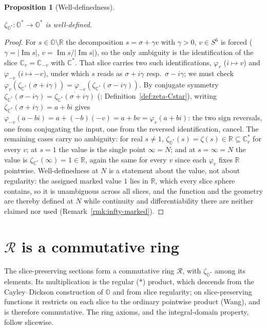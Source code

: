 \documentclass[11pt]{article}
\newcommand{\OO}{\mathbb{O}}
\newcommand{\CC}{\mathbb{C}}
\newcommand{\RR}{\mathbb{R}}
\newcommand{\Ostar}{\OO^{*}}
\newcommand{\Cstar}{\CC^{*}}
\newcommand{\zetaO}{\zeta_{\Ostar}}
\newcommand{\zetaC}{\zeta_{\Cstar}}
\DeclareMathOperator{\im}{Im}
\providecommand{\lean}[1]{}
\providecommand{\uses}[1]{}
\theoremstyle{plain}
\newtheorem{proposition}[theorem]{Proposition}
\theoremstyle{definition}
\theoremstyle{remark}
\begin{document}
\begin{proposition}[Well-definedness]\label{prop:well-defined}
\lean{zetaO_sliceEmbed', riemannZeta_conj}
\uses{def:zeta_O, thm:riemann}
$\zetaO:\Ostar\to\Ostar$ is well-defined.
\end{proposition}
\begin{proof}
For $s\in\OO\setminus\RR$ the decomposition $s=\sigma+\gamma v$ with $\gamma>0$,
$v\in S^6$ is forced ($\gamma=|\im s|$, $v=\im s/|\im s|$), so the only ambiguity is the
identification of the slice $\CC_v=\CC_{-v}$ with $\Cstar$. That slice carries two such
identifications, $\varphi_v$ ($i\mapsto v$) and $\varphi_{-v}$ ($i\mapsto-v$), under
which $s$ reads as $\sigma+i\gamma$ resp.\ $\sigma-i\gamma$; we must check
$\varphi_v(\zetaC(\sigma+i\gamma))=\varphi_{-v}(\zetaC(\sigma-i\gamma))$. By conjugate
symmetry $\zetaC(\sigma-i\gamma)=\overline{\zetaC(\sigma+i\gamma)}$
(\cite[Ch.~2]{Titchmarsh86}; Definition~\ref{def:zeta-Cstar}), writing
$\zetaC(\sigma+i\gamma)=a+bi$ gives $\varphi_{-v}(a-bi)=a+(-b)(-v)=a+bv=\varphi_v(a+bi)$:
the two sign reversals, one from conjugating the input, one from the reversed
identification, cancel. The remaining cases carry no ambiguity: for real $s\neq1$,
$\zetaO(s)=\zeta(s)\in\RR\subseteq\CC_v^{*}$ for every $v$; at $s=1$ the value is the
single point $\infty=N$; and at $s=\infty=N$ the value is $\zetaC(\infty)=1\in\RR$, again
the same for every $v$ since each $\varphi_v$ fixes $\RR$ pointwise.
Well-definedness at $N$ is a statement about the value, not about regularity: the
assigned marked value $1$ lies in $\RR$, which every slice sphere contains, so it is
unambiguous across all slices, and the function and the geometry are thereby defined
at $N$ while continuity and differentiability there are neither claimed nor used
(Remark~\ref{rmk:infty-marked}).
\end{proof}

\section{\texorpdfstring{$\mathcal R$}{R} is a commutative ring}\label{sec:R-ring}

The slice-preserving sections form a commutative ring $\mathcal R$, with $\zetaO$ among its elements.
Its multiplication is the regular ($\ast$) product, which descends from the Cayley--Dickson
construction of $\OO$ and from slice regularity; on slice-preserving functions it restricts on each
slice to the ordinary pointwise product (Wang), and is therefore commutative. The ring axioms, and
the integral-domain property, follow slicewise.
\end{document}
